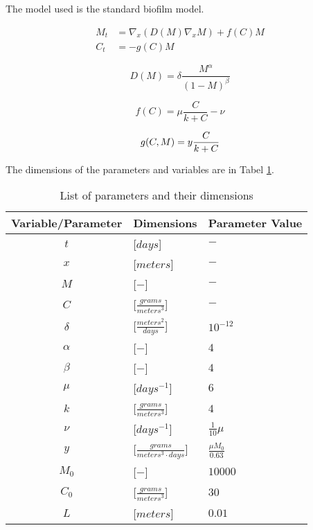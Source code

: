 \documentclass[12pt]{article}
\begin{document}
  The model used is the standard biofilm model.

  \begin{align}
     M_t &= \nabla_x \left(  {D}(M) \nabla_x M \right) + {f}({C})M \\
     {C}_t &= -{g}({C})M
  \end{align}
  
  \begin{equation}
    {D}(M) = {\delta} \frac{M^\alpha}{(1-M)^\beta}
  \end{equation}
  
  \begin{equation}
    f(C) = \mu \frac{C}{k + C} - \nu
  \end{equation}
  
  \begin{equation}
    {g}({C},M) = y\frac{C}{k + C} \\
  \end{equation}
  
  The dimensions of the parameters and variables are in Tabel \ref{tab:varDimensions}.
  
  \begin{table}[!hbt]
    \centering
    \begin{tabular}{|c | l | l|}
      \hline 
      Variable/Parameter & Dimensions & Parameter Value\\
      \hline 
      $ t  $ & [$days$] & $-$ \\
      $ x  $ & [$meters$] & $-$ \\
      $ M  $ & [$-$] & $-$\\
      $ C  $ & [$\frac{grams}{meters^3}$]  & $-$\\
      $ {\delta} $ & [$\frac{meters^2}{days}$] & $10^{-12}$ \\
      $ \alpha $ & [$-$] & $4$\\
      $ \beta  $ & [$-$] & $4$\\
      $ {\mu}$ & [$days^{-1} $] & $6$ \\
      $ {k}  $ & [$\frac{grams}{meters^3}$] & $4$ \\
      $ \nu $ & [$days^{-1}$] & $\frac{1}{10} \mu $ \\
      $ y   $ & [$\frac{grams}{meters^3 \cdot days}$] & $\frac{\mu M_0}{0.63}$ \\
      $ M_0 $ & [$-$] & $10000$ \\
      $ C_0 $ & [$\frac{grams}{meters^3}$]  & $30$ \\
      $ L   $ & [$meters$] & $0.01 $ \\
      \hline
    \end{tabular}
    \caption{List of parameters and their dimensions}
        \label{tab:varDimensions}
  \end{table}
  
\end{document}
